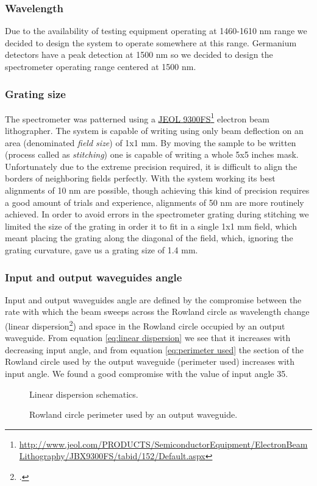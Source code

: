 \documentclass[12pt,twoside,english]{book}
\renewcommand{\~}{\perispomeni}%
\numberwithin{equation}{section}
\numberwithin{figure}{section}
\newcommand\fnurl[2]{%
 \href{#2}{#1}\footnote{\url{#2}}%
}
\begin{document}
\subsubsection{Wavelength}
Due to the availability of testing equipment operating at 1460-1610 nm range we decided to design the system to operate somewhere at this range. Germanium detectors have a peak detection at 1500 nm so we decided to design the spectrometer operating range centered at 1500 nm.
\subsubsection{Grating size}
The spectrometer was patterned using a \fnurl{JEOL 9300FS}{http://www.jeol.com/PRODUCTS/SemiconductorEquipment/ElectronBeamLithography/JBX9300FS/tabid/152/Default.aspx} electron beam lithographer. The system is capable of writing using only beam deflection on an area (denominated \emph{field size}) of 1x1 mm. By moving the sample to be written (process called as \emph{stitching}) one is capable of writing a whole 5x5 inches mask. Unfortunately due to the extreme precision required, it is difficult to align the borders of neighboring fields perfectly. With the system working its best alignments of 10 nm are possible, though achieving this kind of precision requires a good amount of trials and experience, alignments of 50 nm are more routinely achieved. In order to avoid errors in the spectrometer grating during stitching we limited the size of the grating in order it to fit in a single 1x1 mm field, which meant placing the grating along the diagonal of the field, which, ignoring the grating curvature, gave us a grating size of 1.4 mm.

\subsubsection{Input and output waveguides angle}
Input and output waveguides angle are defined by the compromise between the rate with which the beam sweeps across the Rowland circle as wavelength change (linear dispersion\footcite{Chowdhury:2000p56}) and space in the Rowland circle occupied by an output waveguide. From equation \ref{eq:linear dispersion} we see that it increases with decreasing input angle, and from equation \ref{eq:perimeter used} the section of the Rowland circle used by the output waveguide (perimeter used) increases with input angle. We found a good compromise with the value of input angle 35.
\begin{figure}[h]
	\begin{minipage}[t]{0.49\textwidth}
	
	\caption{Linear dispersion schematics.\label{fig:linear dispersion}}
\end{minipage}
\hfill
\begin{minipage}[t]{0.49\textwidth}
	
	\caption{Rowland circle perimeter used by an output waveguide.\label{fig:perimeter used}}
	\end{minipage}
\end{figure}
\end{document}
